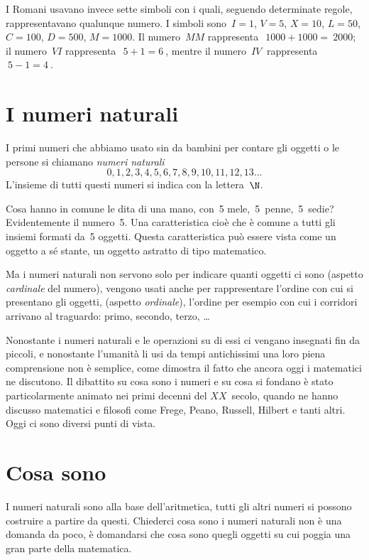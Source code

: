 I Romani usavano invece sette simboli con i quali, seguendo determinate 
regole, rappresentavano qualunque numero. 
I simboli sono~\(I=1\), \(V=5\), \(X=10\), \(L=50\), \(C=100\), \(D=500\), 
\(M=1000\).
Il numero~\(MM\) rappresenta~\(~1000+1000 =~2000\); il numero~\( VI\) 
rappresenta~\(~5+1=6~\), mentre il numero~\( IV~\) rappresenta~\(~5-1=4~\).

\section{I numeri naturali}
\label{sec:01_naturali}

I primi numeri che abbiamo usato sin da bambini per contare gli oggetti o 
le persone si chiamano \emph{numeri naturali}
\[ 0, 1, 2, 3, 4, 5, 6, 7, 8, 9, 10, 11, 12, 13\dots \]
L'insieme di tutti questi numeri si indica con la lettera~\(\N\).

Cosa hanno in comune le dita di una mano, con~5 mele,~5~penne,~5~sedie? 
Evidentemente il numero~5. Una caratteristica cioè che è comune a tutti gli 
insiemi formati da~5 oggetti. 
Questa caratteristica può essere vista come un oggetto a sé stante, 
un oggetto astratto di tipo matematico.

Ma i numeri naturali non servono solo per indicare quanti oggetti ci sono 
(aspetto \emph{cardinale} del numero), vengono usati anche per 
rappresentare 
l'ordine con cui si presentano gli oggetti, (aspetto \emph{ordinale}), 
l'ordine per esempio con cui i corridori arrivano al traguardo: primo, 
secondo, terzo, \ldots

Nonostante i numeri naturali e le operazioni su di essi ci vengano 
insegnati fin da piccoli, e nonostante l'umanità li usi da tempi 
antichissimi una loro piena comprensione non è semplice, come dimostra il 
fatto che ancora oggi i matematici ne discutono. 
Il dibattito su cosa sono i numeri e su cosa si fondano è stato 
particolarmente animato nei primi decenni del \(XX\)~secolo, quando ne hanno 
discusso matematici e filosofi come Frege, Peano, Russell, Hilbert e tanti 
altri. Oggi ci sono diversi punti di vista.

\section{Cosa sono}
\label{sec:01_definizione}

I numeri naturali sono alla base dell'aritmetica, 
tutti gli altri numeri si possono costruire a partire da questi. 
Chiederci cosa sono i numeri naturali non è una domanda da poco, 
è domandarsi che cosa sono quegli oggetti su cui poggia una gran parte della
matematica.

